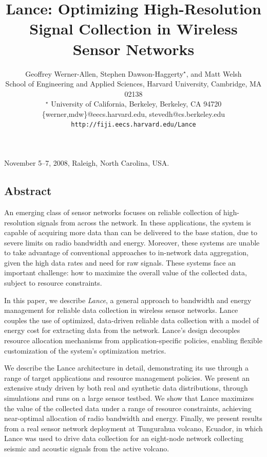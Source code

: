 \documentclass[lettersize]{sig-alternate-konrad}
\begin{document}
 {November 5--7, 2008, Raleigh, North Carolina, USA.} 

\title{{\ttlfnt Lance: Optimizing High-Resolution Signal Collection
in Wireless Sensor Networks}}
\author{{\aufnt Geoffrey Werner-Allen, Stephen Dawson-Haggerty$^\star$, and Matt
Welsh} \\
{\affaddr School of Engineering and Applied Sciences, Harvard
University, Cambridge, MA 02138} \\
{\affaddr $^\star$ University of California, Berkeley, Berkeley, CA 94720} \\
{\affaddr \{werner,mdw\}@eecs.harvard.edu, stevedh@cs.berkeley.edu} \\
{\affaddr \texttt{http://fiji.eecs.harvard.edu/Lance}}}
\maketitle

\maketitle
\thispagestyle{empty}

\subsection*{Abstract}
An emerging class of sensor networks focuses on reliable 
collection of high-resolution signals from across the network.
In these applications, the system is capable of acquiring more 
data than can be delivered to the base station, 
due to severe limits on radio bandwidth and energy.
Moreover, these systems are unable 
to take advantage of conventional approaches to in-network data
aggregation, given the high data rates and need for raw signals.
These systems face an important challenge: how to
maximize the overall value of the collected data, subject to resource constraints.

In this paper, we describe {\em Lance}, a general approach to
bandwidth and energy management for reliable data collection in wireless
sensor networks. Lance couples the use of optimized, data-driven 
reliable data collection with a model of energy cost for extracting 
data from the network. Lance's design decouples resource allocation 
mechanisms from application-specific policies, enabling flexible 
customization of the system's optimization metrics.

We describe the Lance architecture in detail, demonstrating its
use through a range of target applications and resource management
policies. We present an extensive study driven by both 
real and synthetic data distributions, through simulations and runs
on a large sensor testbed.  We show that Lance maximizes 
the value of the collected data under a range of resource 
constraints, achieving near-optimal allocation of radio bandwidth and
energy. Finally, we present results from a real sensor network
deployment at Tungurahua volcano, Ecuador, in which Lance was used to
drive data collection for an eight-node network collecting seismic and
acoustic signals from the active volcano.  
\end{document}
